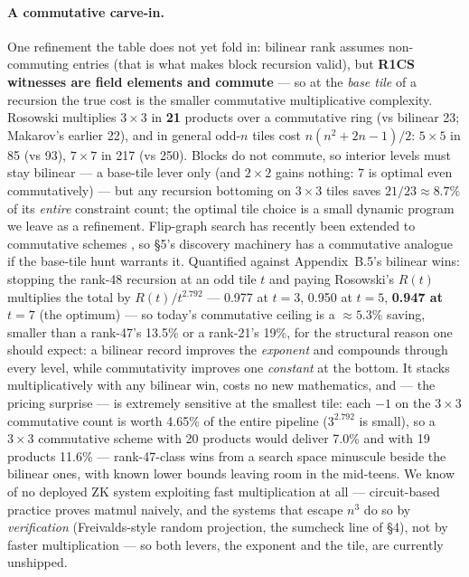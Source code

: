 \documentclass[10pt]{article}
\begin{document}
\paragraph{A commutative carve-in.} One refinement the table does
not yet fold in: bilinear rank assumes non-commuting entries (that
is what makes block recursion valid), but \textbf{R1CS witnesses
are field elements and commute} --- so at the \emph{base tile} of
a recursion the true cost is the smaller commutative
multiplicative complexity. Rosowski \cite{rosowski} multiplies
$3{\times}3$ in \textbf{21} products over a commutative ring (vs
bilinear 23; Makarov's earlier 22), and in general odd-$n$ tiles
cost $n(n^2+2n-1)/2$: $5{\times}5$ in 85 (vs 93), $7{\times}7$ in
217 (vs 250). Blocks do not commute, so interior levels must stay
bilinear --- a base-tile lever only (and $2{\times}2$ gains
nothing: 7 is optimal even commutatively) --- but any recursion
bottoming on $3{\times}3$ tiles saves $21/23 \approx 8.7\%$ of
its \emph{entire} constraint count; the optimal tile choice is a
small dynamic program we leave as a refinement. Flip-graph search
has recently been extended to commutative schemes
\cite{commflip}, so \S5's discovery machinery has a commutative
analogue if the base-tile hunt warrants it.
Quantified against Appendix~B.5's bilinear wins: stopping the
rank-48 recursion at an odd tile $t$ and paying Rosowski's $R(t)$
multiplies the total by $R(t)/t^{2.792}$ --- 0.977 at $t{=}3$,
0.950 at $t{=}5$, \textbf{0.947 at $t{=}7$} (the optimum) --- so
today's commutative ceiling is a ${\approx}5.3\%$ saving, smaller
than a rank-47's 13.5\% or a rank-21's 19\%, for the structural
reason one should expect: a bilinear record improves the
\emph{exponent} and compounds through every level, while
commutativity improves one \emph{constant} at the bottom. It
stacks multiplicatively with any bilinear win, costs no new
mathematics, and --- the pricing surprise --- is extremely
sensitive at the smallest tile: each $-1$ on the $3{\times}3$
commutative count is worth 4.65\% of the entire pipeline
($3^{2.792}$ is small), so a $3{\times}3$ commutative scheme with
20 products would deliver 7.0\% and with 19 products 11.6\% ---
rank-47-class wins from a search space minuscule beside the
bilinear ones, with known lower bounds leaving room in the
mid-teens. We know of no deployed ZK system exploiting fast
multiplication at all --- circuit-based practice proves matmul
naively, and the systems that escape $n^3$ do so by
\emph{verification} (Freivalds-style random projection, the
sumcheck line of \S4), not by faster multiplication --- so both
levers, the exponent and the tile, are currently unshipped.
\end{document}
